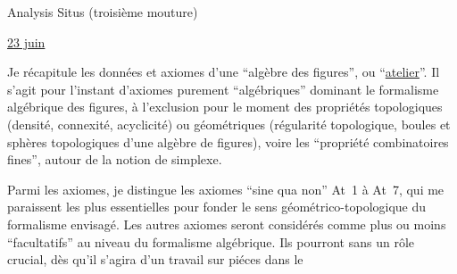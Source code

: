 \begin{center}Analysis Situs (troisième mouture)\end{center}

\uline{23 juin}

Je récapitule les données et axiomes d'une ``algèbre des figures'', ou ``\uline{atelier}''. \margin{--}Il s'agit pour l'instant d'axiomes purement ``algébriques'' dominant le formalisme algébrique des figures, à l'exclusion pour le moment des propriétés topologiques (densité, connexité, acyclicité) ou  géométriques (régularité topologique, boules et sphères topologiques d'une algèbre de figures), voire les ``propriété combinatoires fines'', autour de la notion de simplexe.

Parmi les axiomes, je distingue les axiomes ``sine qua non'' At~1 à At~7, qui me paraissent les plus essentielles pour fonder le sens géométrico-topologique du formalisme envisagé. Les autres axiomes seront considérés comme plus ou moins ``facultatifs'' au niveau du formalisme algébrique. Ils pourront sans  un rôle crucial, dès qu'il s'agira d'un travail sur piéces dans le
